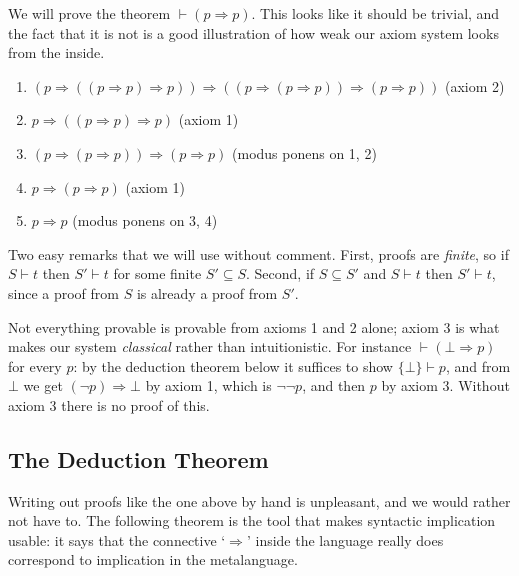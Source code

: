 \begin{example}
  We will prove the theorem $\vdash (p \Rightarrow p)$. This looks like it should be trivial, and the fact that it is not is a good illustration of how weak our axiom system looks from the inside.
  \begin{enumerate}
    \item $(p \Rightarrow((p \Rightarrow p) \Rightarrow p)) \Rightarrow((p \Rightarrow(p \Rightarrow p)) \Rightarrow(p \Rightarrow p))$ \hfill (axiom 2)
    \item $p \Rightarrow((p \Rightarrow p) \Rightarrow p)$ \hfill (axiom 1)
    \item $(p \Rightarrow(p \Rightarrow p)) \Rightarrow(p \Rightarrow p)$ \hfill (modus ponens on 1, 2)
    \item $p \Rightarrow(p \Rightarrow p)$ \hfill (axiom 1)
    \item $p \Rightarrow p$ \hfill (modus ponens on 3, 4)
  \end{enumerate}
\end{example}

Two easy remarks that we will use without comment. First, proofs are \emph{finite}, so if $S \vdash t$ then $S' \vdash t$ for some finite $S' \subseteq S$. Second, if $S \subseteq S'$ and $S \vdash t$ then $S' \vdash t$, since a proof from $S$ is already a proof from $S'$.

\begin{example}
  Not everything provable is provable from axioms 1 and 2 alone; axiom 3 is what makes our system \emph{classical} rather than intuitionistic. For instance $\vdash (\bot \Rightarrow p)$ for every $p$: by the deduction theorem below it suffices to show $\{\bot\} \vdash p$, and from $\bot$ we get $(\lnot p) \Rightarrow \bot$ by axiom 1, which is $\lnot\lnot p$, and then $p$ by axiom 3. Without axiom 3 there is no proof of this.
\end{example}

\subsection{The Deduction Theorem}

Writing out proofs like the one above by hand is unpleasant, and we would rather not have to. The following theorem is the tool that makes syntactic implication usable: it says that the connective `$\Rightarrow$' inside the language really does correspond to implication in the metalanguage.

